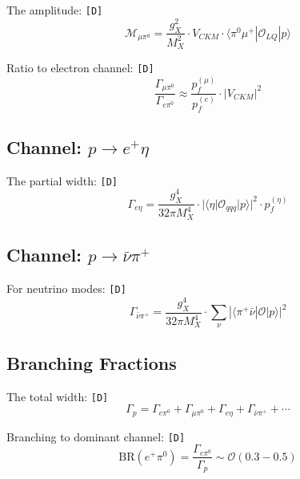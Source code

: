 \documentclass[11pt,a4paper]{article}
\newcommand{\tagD}{\textcolor{green!50!black}{\texttt{[D]}}}
\theoremstyle{definition}
\begin{document}
The amplitude: \tagD{}
\begin{equation}
\label{eq:ch-mupi0-amp}
\mathcal{M}_{\mu\pi^0} = \frac{g_X^2}{M_X^2} \cdot V_{CKM} \cdot \langle \pi^0 \mu^+ | \mathcal{O}_{LQ} | p \rangle
\end{equation}

Ratio to electron channel: \tagD{}
\begin{equation}
\label{eq:ch-mupi0-ratio}
\frac{\Gamma_{\mu\pi^0}}{\Gamma_{e\pi^0}} \approx \frac{p_f^{(\mu)}}{p_f^{(e)}} \cdot |V_{CKM}|^2
\end{equation}

\subsection{Channel: $p \to e^+ \eta$}
\label{app:eeta}

The partial width: \tagD{}
\begin{equation}
\label{eq:ch-eeta-width}
\Gamma_{e\eta} = \frac{g_X^4}{32\pi M_X^4} \cdot |\langle \eta | \mathcal{O}_{qqq} | p \rangle|^2 \cdot p_f^{(\eta)}
\end{equation}

\subsection{Channel: $p \to \bar{\nu} \pi^+$}
\label{app:nupi}

For neutrino modes: \tagD{}
\begin{equation}
\label{eq:ch-nupi-width}
\Gamma_{\bar{\nu}\pi^+} = \frac{g_X^4}{32\pi M_X^4} \cdot \sum_\nu |\langle \pi^+ \bar{\nu} | \mathcal{O} | p \rangle|^2
\end{equation}

\subsection{Branching Fractions}
\label{app:branching}

The total width: \tagD{}
\begin{equation}
\label{eq:total-width}
\Gamma_p = \Gamma_{e\pi^0} + \Gamma_{\mu\pi^0} + \Gamma_{e\eta} + \Gamma_{\bar{\nu}\pi^+} + \cdots
\end{equation}

Branching to dominant channel: \tagD{}
\begin{equation}
\label{eq:branching}
\text{BR}(e^+\pi^0) = \frac{\Gamma_{e\pi^0}}{\Gamma_p} \sim \mathcal{O}(0.3-0.5)
\end{equation}
\end{document}
